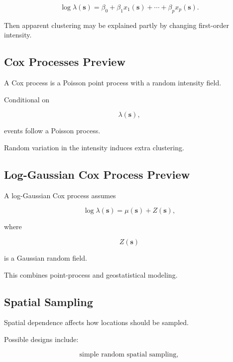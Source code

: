 \[
\boxed{
\log
\lambda(\mathbf{s})
=
\beta_0
+
\beta_1x_1(\mathbf{s})
+
\cdots
+
\beta_px_p(\mathbf{s}).
}
\]

Then apparent clustering may be explained partly by changing first-order
intensity.

\subsection{Cox Processes Preview}
\label{subsec:cox-processes-preview}

A Cox process is a Poisson point process with a random intensity field.

Conditional on

\[
\lambda(\mathbf{s}),
\]

events follow a Poisson process.

Random variation in the intensity induces extra clustering.

\subsection{Log-Gaussian Cox Process Preview}
\label{subsec:log-gaussian-cox-process}

A log-Gaussian Cox process assumes

\[
\boxed{
\log
\lambda(\mathbf{s})
=
\mu(\mathbf{s})
+
Z(\mathbf{s}),
}
\]

where

\[
Z(\mathbf{s})
\]

is a Gaussian random field.

This combines point-process and geostatistical modeling.

\subsection{Spatial Sampling}
\label{subsec:spatial-sampling}

Spatial dependence affects how locations should be sampled.

Possible designs include:

\[
\boxed{
\text{simple random spatial sampling},
}
\]

